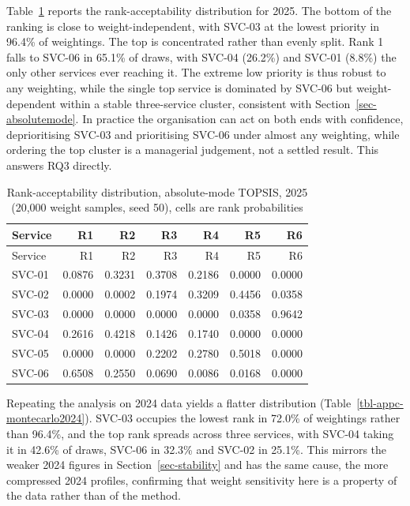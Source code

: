 \documentclass[
  12pt,
  letterpaper,
  12pt,
  oneside,
  english,
  onehalfspacing,
  headsepline]{MastersDoctoralThesis}
\begin{document}
Table~\ref{tbl-montecarlo} reports the rank-acceptability distribution
for 2025. The bottom of the ranking is close to weight-independent, with
SVC-03 at the lowest priority in 96.4\% of weightings. The top is
concentrated rather than evenly split. Rank 1 falls to SVC-06 in 65.1\%
of draws, with SVC-04 (26.2\%) and SVC-01 (8.8\%) the only other
services ever reaching it. The extreme low priority is thus robust to
any weighting, while the single top service is dominated by SVC-06 but
weight-dependent within a stable three-service cluster, consistent with
Section~\ref{sec-absolutemode}. In practice the organisation can act on
both ends with confidence, deprioritising SVC-03 and prioritising SVC-06
under almost any weighting, while ordering the top cluster is a
managerial judgement, not a settled result. This answers RQ3 directly.

\vspace{2.5cm}
\begin{samepage}
\footnotesize

\begin{longtable}[]{@{}lrrrrrr@{}}
\caption{Rank-acceptability distribution, absolute-mode TOPSIS, 2025
(20,000 weight samples, seed 50), cells are rank
probabilities}\label{tbl-montecarlo}\tabularnewline
\toprule\noalign{}
Service & R1 & R2 & R3 & R4 & R5 & R6 \\
\midrule\noalign{}
\endfirsthead
\toprule\noalign{}
Service & R1 & R2 & R3 & R4 & R5 & R6 \\
\midrule\noalign{}
\endhead
\bottomrule\noalign{}
\endlastfoot
SVC-01 & 0.0876 & 0.3231 & 0.3708 & 0.2186 & 0.0000 & 0.0000 \\
SVC-02 & 0.0000 & 0.0002 & 0.1974 & 0.3209 & 0.4456 & 0.0358 \\
SVC-03 & 0.0000 & 0.0000 & 0.0000 & 0.0000 & 0.0358 & 0.9642 \\
SVC-04 & 0.2616 & 0.4218 & 0.1426 & 0.1740 & 0.0000 & 0.0000 \\
SVC-05 & 0.0000 & 0.0000 & 0.2202 & 0.2780 & 0.5018 & 0.0000 \\
SVC-06 & 0.6508 & 0.2550 & 0.0690 & 0.0086 & 0.0168 & 0.0000 \\
\end{longtable}

\end{samepage}

Repeating the analysis on 2024 data yields a flatter distribution
(Table~\ref{tbl-appc-montecarlo2024}). SVC-03 occupies the lowest rank
in 72.0\% of weightings rather than 96.4\%, and the top rank spreads
across three services, with SVC-04 taking it in 42.6\% of draws, SVC-06
in 32.3\% and SVC-02 in 25.1\%. This mirrors the weaker 2024 figures in
Section~\ref{sec-stability} and has the same cause, the more compressed
2024 profiles, confirming that weight sensitivity here is a property of
the data rather than of the method.
\end{document}
